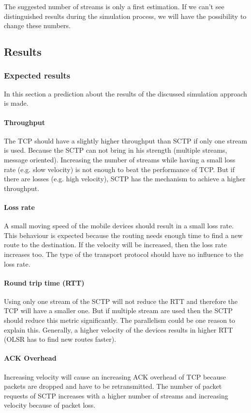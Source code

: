 \documentclass[a4paper]{article}
\begin{document}
The suggested number of streams is only a first estimation. If we can’t see distinguished results during the simulation process, we will have the possibility to change these numbers.
\subsection{Results}
\subsubsection{Expected results}
In this section a prediction about the results of the discussed simulation approach is made.

\paragraph{Throughput}
The TCP should have a slightly higher throughput than SCTP if only one stream is used. Because the SCTP can not bring in his strength (multiple streams, message oriented). Increasing the number of streams while having a small loss rate (e.g. slow velocity) is not enough to beat the performance of TCP. But if there are losses (e.g. high velocity), SCTP has the mechanism to achieve a higher throughput.
\paragraph{Loss rate}
A small moving speed of the mobile devices should result in a small loss rate. This behaviour is expected because the routing needs enough time to find a new route to the destination. If the velocity will be increased, then the loss rate increases too. The type of the transport protocol should have no influence to the loss rate.
\paragraph{Round trip time (RTT)}
Using only one stream of the SCTP will not reduce the RTT and therefore the TCP will have a smaller one. But if multiple stream are used then the SCTP should reduce this metric significantly. The parallelism could be one reason to explain this. Generally, a higher velocity of the devices results in higher RTT (OLSR has to find new routes faster).
\paragraph{ACK Overhead}
Increasing velocity will cause an increasing ACK overhead of TCP because packets are dropped and have to be retransmitted. The number of packet requests of SCTP increases with a higher number of streams and increasing velocity because of packet loss.
\end{document}
